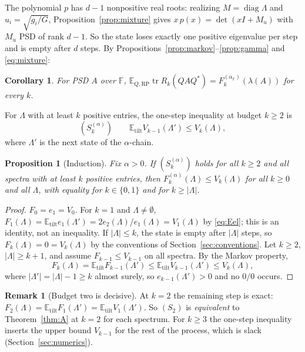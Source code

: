 \documentclass[11pt,a4paper]{article}
\newtheorem{proposition}[theorem]{Proposition}
\newtheorem{corollary}[theorem]{Corollary}
\theoremstyle{definition}
\newtheorem{remark}[theorem]{Remark}
\newcommand{\E}{\mathbb{E}}
\newcommand{\F}{\mathbb{F}}
\newcommand{\tr}{\operatorname{tr}}
\newcommand{\diag}{\operatorname{diag}}
\newcommand{\tilt}{\mathrm{tilt}}
\newcommand{\RP}{\mathrm{RP}}
\begin{document}
The polynomial $p$ has $d-1$ nonpositive real roots: realizing $M=\diag\Lambda$ and $u_i=\sqrt{g_i/G}$, Proposition~\ref{prop:mixture} gives $x\,p(x)=\det(xI+M_u)$ with $M_u$ PSD of rank $d-1$. So the state loses exactly one positive eigenvalue per step and is empty after $d$ steps. By Propositions~\ref{prop:markov}--\ref{prop:gamma} and \eqref{eq:mixture}:

\begin{corollary}\label{cor:chainid}
For PSD $A$ over $\F$, $\E_{Q,\RP}\tr R_k(QAQ^*)=F_k^{(\alpha_\F)}(\lambda(A))$ for every $k$.
\end{corollary}

For $\Lambda$ with at least $k$ positive entries, the one-step inequality at budget $k\ge2$ is
\[
(S_k^{(\alpha)})\qquad\E_\tilt V_{k-1}(\Lambda')\le V_k(\Lambda),
\]
where $\Lambda'$ is the next state of the $\alpha$-chain.

\begin{proposition}[Induction]\label{prop:induction}
Fix $\alpha>0$. If $(S_k^{(\alpha)})$ holds for all $k\ge2$ and all spectra with at least $k$ positive entries, then $F^{(\alpha)}_k(\Lambda)\le V_k(\Lambda)$ for all $k\ge0$ and all $\Lambda$, with equality for $k\in\{0,1\}$ and for $k\ge|\Lambda|$.
\end{proposition}

\begin{proof}
$F_0=e_1=V_0$. For $k=1$ and $\Lambda\neq\emptyset$, $F_1(\Lambda)=\E_\tilt e_1(\Lambda')=2e_2(\Lambda)/e_1(\Lambda)=V_1(\Lambda)$ by \eqref{eq:Eel}; this is an identity, not an inequality. If $|\Lambda|\le k$, the state is empty after $|\Lambda|$ steps, so $F_k(\Lambda)=0=V_k(\Lambda)$ by the conventions of Section~\ref{sec:conventions}. Let $k\ge2$, $|\Lambda|\ge k+1$, and assume $F_{k-1}\le V_{k-1}$ on all spectra. By the Markov property,
\[
F_k(\Lambda)=\E_\tilt F_{k-1}(\Lambda')\le\E_\tilt V_{k-1}(\Lambda')\le V_k(\Lambda),
\]
where $|\Lambda'|=|\Lambda|-1\ge k$ almost surely, so $e_{k-1}(\Lambda')>0$ and no $0/0$ occurs.
\end{proof}

\begin{remark}[Budget two is decisive]\label{rem:S2}
At $k=2$ the remaining step is exact: $F_2(\Lambda)=\E_\tilt F_1(\Lambda')=\E_\tilt V_1(\Lambda')$. So $(S_2)$ is \emph{equivalent} to Theorem~\ref{thm:A} at $k=2$ for each spectrum. For $k\ge3$ the one-step inequality inserts the upper bound $V_{k-1}$ for the rest of the process, which is slack (Section~\ref{sec:numerics}).
\end{remark}
\end{document}
